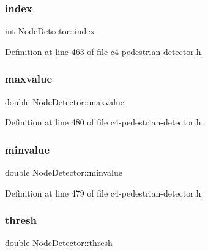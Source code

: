 \subsubsection{\texorpdfstring{index}{index}}
{\footnotesize\ttfamily int Node\+Detector\+::index}



Definition at line 463 of file c4-\/pedestrian-\/detector.\+h.

\mbox{\label{class_node_detector_adb33cb202a422de76467e72f1b146610}} 
\subsubsection{\texorpdfstring{maxvalue}{maxvalue}}
{\footnotesize\ttfamily double Node\+Detector\+::maxvalue\hspace{0.3cm}{\ttfamily [private]}}



Definition at line 480 of file c4-\/pedestrian-\/detector.\+h.

\mbox{\label{class_node_detector_ab069f95bc20f00754a15c62c932b7e77}} 
\subsubsection{\texorpdfstring{minvalue}{minvalue}}
{\footnotesize\ttfamily double Node\+Detector\+::minvalue\hspace{0.3cm}{\ttfamily [private]}}



Definition at line 479 of file c4-\/pedestrian-\/detector.\+h.

\mbox{\label{class_node_detector_a2fd8792e80f3f31d2d07831a5169935f}} 
\subsubsection{\texorpdfstring{thresh}{thresh}}
{\footnotesize\ttfamily double Node\+Detector\+::thresh}



